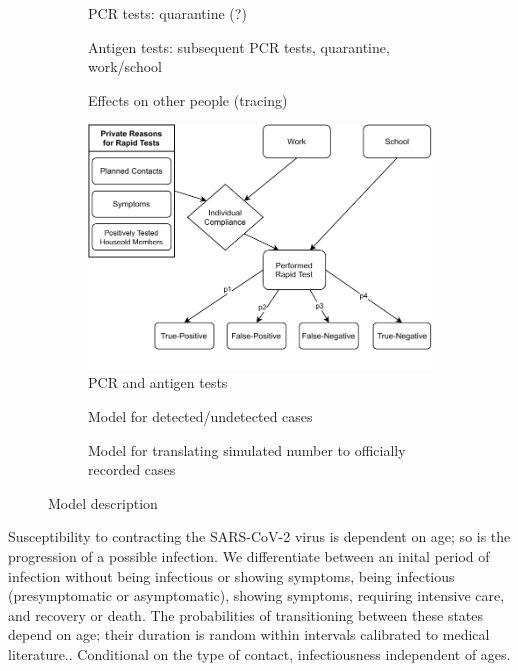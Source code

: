 \begin{figure}[!tp]
\begin{subfigure}[b]{0.475\textwidth}
        PCR tests: quarantine (?)

        Antigen tests: subsequent PCR tests, quarantine, work/school

        Effects on other people (tracing)

        \includegraphics[width=\textwidth]{../figures/model-graph-bottom-left}
        \caption{{\small PCR and antigen tests}}
        \label{fig:pcr_antigen_tests}
    \end{subfigure}
    \hfill
    \begin{subfigure}[b]{0.475\textwidth}
        \centering

        Model for detected/undetected cases

        \caption{{\small Model for translating simulated number to officially recorded cases}}
        \label{fig:model_for_official_cases}
    \end{subfigure}

    \caption{Model description}
    \label{fig:model-description}
\end{figure}


Susceptibility to contracting the SARS-CoV-2 virus is dependent on age; so is the progression of a possible infection. We differentiate between an inital period of infection without being infectious or showing symptoms, being infectious (presymptomatic or asymptomatic), showing symptoms, requiring intensive care, and recovery or death. The probabilities of transitioning between these states depend on age; their duration is random within intervals calibrated to medical literature.. Conditional on the type of contact, infectiousness independent of ages.


